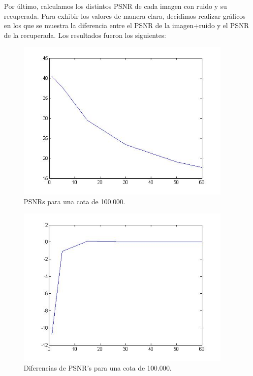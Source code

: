 \documentclass[10pt, a4paper]{article}
\begin{document}
\begin{itemize}
Por último, calculamos los distintos PSNR de cada imagen con ruido y su recuperada. Para exhibir los valores de manera clara, decidimos realizar gráficos en los que se muestra la diferencia entre el PSNR de la imagen+ruido y el PSNR de la recuperada. Los resultados fueron los siguientes:\newline


\begin{figure}[H] %
\begin{center}
\includegraphics[width=300pt]{./imgsPX100k.jpg}
\caption[h]{PSNRs para una cota de 100.000.}
\end{center}
\end{figure}


\begin{figure}[H] %
\begin{center}
\includegraphics[width=300pt]{./imgsPXY100k.jpg}
\caption[h]{Diferencias de PSNR's para una cota de 100.000.}
\end{center}
\end{figure}



\end{itemize}
\end{document}
